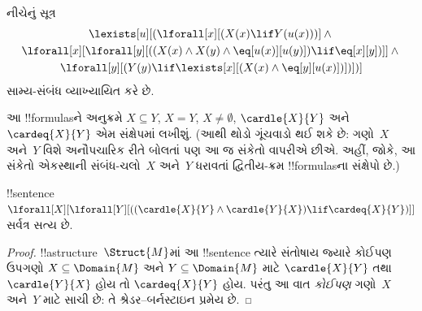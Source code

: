 \documentclass[../../../include/open-logic-section]{subfiles}
\begin{document}
\begin{prop}
નીચેનું સૂત્ર
\begin{multline*}
  \lexists[u][(\lforall[x][(X(x) \lif Y(u(x)))] \land {}\\
    \lforall[x][\lforall[y][((X(x) \land X(y) \land \eq[u(x)][u(y)]) \lif \eq[x][y])]]
  \land {} \\\lforall[y][(Y(y) \lif \lexists[x][(X(x)
      \land \eq[y][u(x)])])])]
\end{multline*}
સામ્ય-સંબંધ વ્યાખ્યાયિત કરે છે.
\end{prop}


આ !!{formula}sને અનુક્રમે $X \subseteq Y$, $X = Y$, $X \neq
\emptyset$, $\cardle{X}{Y}$ અને $\cardeq{X}{Y}$ એમ સંક્ષેપમાં
લખીશું. (આથી થોડો ગૂંચવાડો થઈ શકે છે: ગણો~$X$ અને~$Y$ વિશે
અનૌપચારિક રીતે બોલતાં પણ આ જ સંકેતો વાપરીએ છીએ. અહીં, જોકે, આ
સંકેતો એકસ્થાની સંબંધ-ચલો~$X$ અને~$Y$ ધરાવતાં દ્વિતીય-ક્રમ
!!{formula}sના સંક્ષેપો છે.)

\begin{prop}
!!{sentence}~$\lforall[X][\lforall[Y][((\cardle{X}{Y} \land
    \cardle{Y}{X}) \lif \cardeq{X}{Y})]]$ સર્વત્ર સત્ય છે.
\end{prop}

\begin{proof}
!!a{structure}~$\Struct{M}$માં આ !!{sentence} ત્યારે સંતોષાય જ્યારે
કોઈપણ ઉપગણો $X \subseteq \Domain{M}$ અને $Y \subseteq
\Domain{M}$ માટે $\cardle{X}{Y}$ તથા $\cardle{Y}{X}$ હોય તો
$\cardeq{X}{Y}$ હોય. પરંતુ આ વાત \emph{કોઈપણ} ગણો~$X$ અને~$Y$
માટે સાચી છે: તે શ્રેડર--બર્નસ્ટાઇન પ્રમેય છે.
\end{proof}
\end{document}
